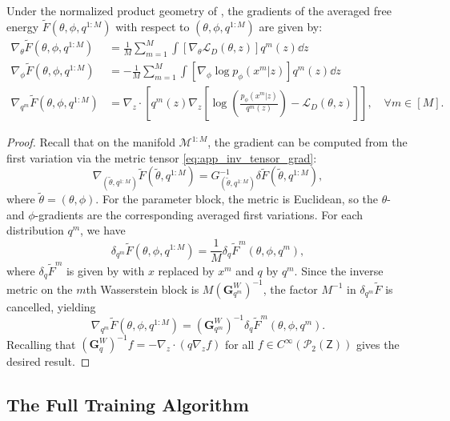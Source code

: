 \begin{proposition}
    Under the normalized product geometry of , the gradients of the averaged free energy $\tilde{F}(\theta, \phi, q^{1:M})$ with respect to $(\theta, \phi, q^{1:M})$ are given by:
    \begin{align}
    \nabla_\theta \tilde{F}(\theta, \phi, q^{1:M}) &= \frac{1}{M}\sum_{m=1}^M \int \left[\nabla_{\theta} \mathcal{L}_D(\theta, z)\right] q^m(z) \dd z \\
    \nabla_\phi \tilde{F}(\theta, \phi, q^{1:M}) &= -\frac{1}{M}\sum_{m=1}^M \int \left[\nabla_{\phi} \log p_{\phi}( x^m | z)\right] q^m(z) \dd z \\
    \nabla_{q^m} \tilde{F}(\theta, \phi, q^{1:M}) &=  \nabla_{z} \cdot \left[
        q^m(z) \nabla_{z} \left[
            \log \left(
                \frac{p_{\phi}( x^m|z)}{q^m(z)}
            \right) - \mathcal{L}_D(\theta, z)
        \right]
    \right], \quad \forall m\in[M].
\end{align}
\end{proposition}
\begin{proof}
    Recall that on the manifold $\mathcal{M}^{1:M}$, the gradient can be computed from the first variation via the metric tensor \eqref{eq:app_inv_tensor_grad}:
    \begin{equation*}
        \nabla_{(\tilde{\theta},q^{1:M})} \tilde{F}(\tilde{\theta},q^{1:M}) = G_{(\tilde{\theta}, q^{1:M})}^{-1} \delta \tilde{F}(\tilde{\theta}, q^{1:M}),
    \end{equation*}
    where $\tilde{\theta}=(\theta, \phi)$. For the parameter block, the metric is Euclidean, so the $\theta$- and $\phi$-gradients are the corresponding averaged first variations. For each distribution $q^m$, we have
    \[
        \delta_{q^m}\tilde{F}(\theta,\phi,q^{1:M}) = \frac{1}{M}\delta_q \tilde{F}^m(\theta,\phi,q^m),
    \]
    where $\delta_q \tilde{F}^m$ is given by  with $x$ replaced by $x^m$ and $q$ by $q^m$. Since the inverse metric on the $m$th Wasserstein block is $M(\mathbf{G}_{q^m}^W)^{-1}$, the factor $M^{-1}$ in $\delta_{q^m}\tilde{F}$ is cancelled, yielding
    \[
        \nabla_{q^m}\tilde{F}(\theta,\phi,q^{1:M}) = (\mathbf{G}_{q^m}^W)^{-1}\delta_q \tilde{F}^m(\theta,\phi,q^m).
    \]
    Recalling that $(\mathbf{G}_q^W)^{-1}f=-\nabla_{z} \cdot (q \nabla_{z}f)$ for all $f\in C^\infty(\mathcal{P}_2(\mathsf{Z}))$ gives the desired result.
\end{proof}

\subsection{The Full Training Algorithm}
\label{app:precond_training_alg}

